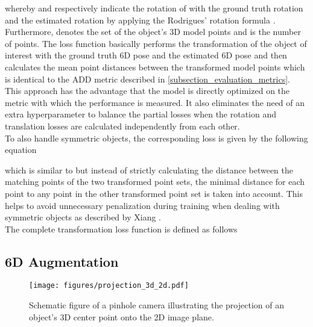 \documentclass[twocolumn, 10pt, letterpaper]{article}
\begin{document}
whereby  and  respectively indicate the rotation of  with the ground truth rotation  and the estimated rotation  by applying the Rodrigues' rotation formula \cite{RodriguesRotation_1}\cite{RodriguesRotation_2}. Furthermore,  denotes the set of the object's 3D model points and  is the number of points. The loss function basically performs the transformation of the object of interest with the ground truth 6D pose and the estimated 6D pose and then calculates the mean point distances between the transformed model points which is identical to the ADD metric described in \autoref{subsection_evaluation_metrics}. This approach has the advantage that the model is directly optimized on the metric with which the performance is measured. It also eliminates the need of an extra hyperparameter to balance the partial losses when the rotation and translation losses are calculated independently from each other.\\

To also handle symmetric objects, the corresponding loss  is given by the following equation

which is similar to  but instead of strictly calculating the distance between the matching points of the two transformed point sets, the minimal distance for each point to any point in the other transformed point set is taken into account. This helps to avoid unnecessary penalization during training when dealing with symmetric objects as described by Xiang \etal\cite{PoseCNN}.\\

The complete transformation loss function  is defined as follows


\subsection{6D Augmentation}
\label{subsection_6d_augmentation}

\begin{figure}[b]
\texttt{[image: figures/projection\_3d\_2d.pdf]}
\caption{Schematic figure of a pinhole camera illustrating the projection of an object's 3D center point onto the 2D image plane.}
\label{figure_camera_3d_2d_projection}
\end{figure}
\end{document}
